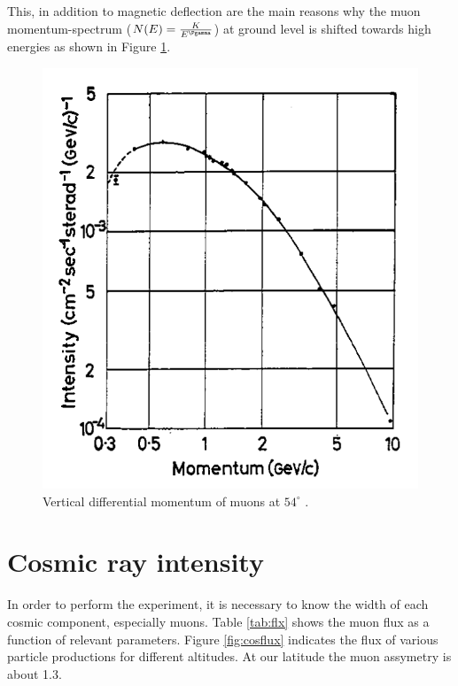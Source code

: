 This, in addition to magnetic deflection are the main reasons why the muon momentum-spectrum ($N(E)=\frac{K}{E^{\Pgamma}}$) at ground level is shifted towards high energies as shown in Figure \ref{fig:shift}.

\begin{figure}[htbp]
\centering
\includegraphics[width=0.5\linewidth]{./fig/shiftDur.png}
\caption{Vertical differential momentum of muons at $54^\circ$ \cite{Gardener_1962}.}
\label{fig:shift}
\end{figure}


\section{Cosmic ray intensity}

In order to perform the experiment, it is necessary to know the width of each cosmic component, especially muons. Table \ref{tab:flx} shows the muon flux as a function of relevant parameters. Figure \ref{fig:cosflux} indicates the flux of various particle productions for different altitudes. At our latitude the muon assymetry is about 1.3.

